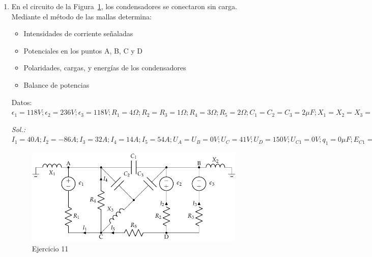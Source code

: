 \documentclass[11pt]{book} %
\begin{document}
\begin{enumerate}
\item En el circuito de la Figura~\ref{fig.mallas_condensadores}, los condensadores se conectaron sin
carga. Mediante el método de las mallas determina:
\begin{itemize}
\item Intensidades de corriente señaladas
\item Potenciales en los puntos A, B, C y D
\item Polaridades, cargas, y energías de los condensadores
\item Balance de potencias
\end{itemize}
Datos: $ \epsilon_{1}={118}V; \epsilon_{2}={236} V; \epsilon_{3}=118V; R_{1}= {4}\Omega; R_{2}=R_{3}={1}{\Omega}; R_{4}= {3}{\Omega}; R_{5}={2}{\Omega}; C_{1}=C_{2}=C_{3}={2}{\mu F}; X_1 = X_2 = X_3 = {1}{\Omega}$

\emph{Sol.: $I_1=40A; I_2=-86A; I_3=32A; I_4=14A; I_5=54A; U_A=U_B=0V; U_C=41V; U_D=150V; U_{C1}=0V; q_1=0\mu F; E_{C1}=0J; U_{C2}=-42V; q_2=84\mu F; E_{C2}=1.76 mJ; U_{C3}=-42V; q_3=84\mu F; E_{C3}=1.76 mJ; \sum P = 0$}
    \begin{figure}[htbp]
        \centering
        \includegraphics{../figs/mallas_condensadores.pdf}
        \caption{Ejercicio 11}
        \label{fig.mallas_condensadores}
    \end{figure}


\end{enumerate}
\end{document}
